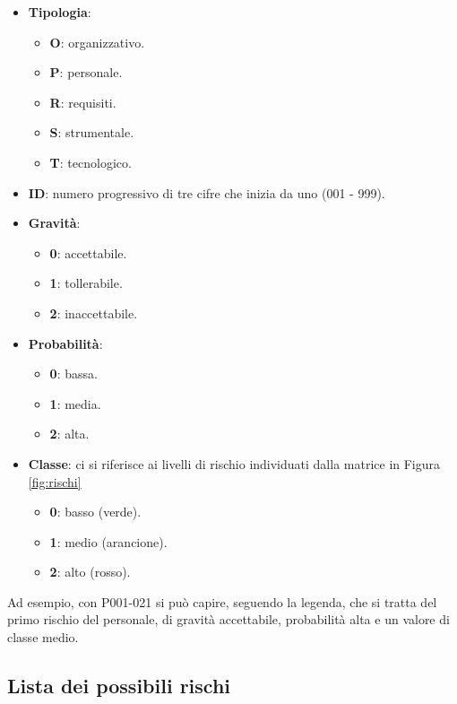 	\begin{itemize}
		\item \textbf{Tipologia}:
			\begin{itemize}
				\item \textbf{O}: organizzativo.
				\item \textbf{P}: personale.
				\item \textbf{R}: requisiti.
				\item \textbf{S}: strumentale.
				\item \textbf{T}: tecnologico.
			\end{itemize}

		\item \textbf{ID}: numero progressivo di tre cifre che inizia da uno (001 - 999).
		\item \textbf{Gravità}:
			\begin{itemize}
				\item \textbf{0}: accettabile.
				\item \textbf{1}: tollerabile.
				\item \textbf{2}: inaccettabile.
			\end{itemize}

		\item \textbf{Probabilità}:
			\begin{itemize}
				\item \textbf{0}: bassa.
				\item \textbf{1}: media.
				\item \textbf{2}: alta.
			\end{itemize}

		\item \textbf{Classe}: ci si riferisce ai livelli di rischio individuati dalla matrice in Figura \ref{fig:rischi}
			\begin{itemize}
				\item \textbf{0}: basso (verde).
				\item \textbf{1}: medio (arancione).
				\item \textbf{2}: alto (rosso).
			\end{itemize}
	\end{itemize}

	Ad esempio, con P001-021 si può capire, seguendo la legenda, che si tratta del primo rischio del personale, di gravità accettabile, probabilità alta e un valore
	di classe medio.

	\subsection{Lista dei possibili rischi}

